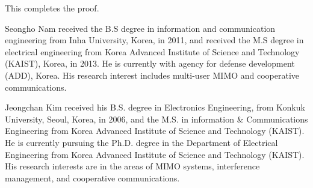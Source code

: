 \documentclass[journal,twoside]{IEEEtranTCOM}
\begin{document}
This completes the proof.






%

\begin{biography}{Seongho Nam}
received the B.S degree in information and communication engineering from Inha University, Korea, in 2011, and received the M.S degree in electrical engineering from Korea Advanced Institute of Science and Technology (KAIST), Korea, in 2013. He is currently with agency for defense development (ADD), Korea. His research interest includes multi-user MIMO and cooperative communications.
\end{biography}

\begin{biography}{Jeongchan Kim}
received his B.S. degree in Electronics Engineering, from Konkuk University, Seoul, Korea, in 2006, and the M.S. in information \& Communications Engineering from Korea Advanced Institute of Science and Technology (KAIST). He is currently pursuing the Ph.D. degree in the Department of Electrical Engineering from Korea Advanced Institute of Science and Technology (KAIST). His research interests are in the areas of MIMO systems, interference management, and cooperative communications.
\end{biography}
\end{document}
